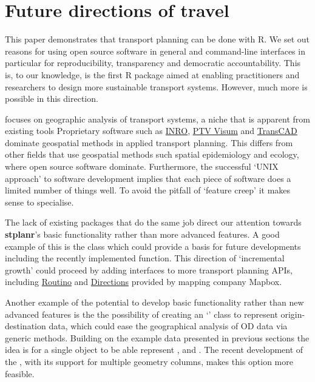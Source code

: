 \section{Future directions of travel}\label{future-directions-of-travel}

This paper demonstrates that transport planning can be done with R.
We set out reasons for using open source software in general and command-line interfaces in particular for reproducibility, transparency and democratic accountability.
This is, to our knowledge, is the first R package aimed at enabling practitioners and researchers to design more sustainable transport systems.
However, much more is possible in this direction.

 focuses on geographic analysis of transport systems, a niche that is apparent from existing tools
Proprietary software such as \href{https://www.inrosoftware.com/en/products/emme/}{INRO}, \href{http://vision-traffic.ptvgroup.com/en-us/products/ptv-visum/}{PTV Visum} and  \href{http://www.caliper.com/tcovu.htm}{TransCAD} dominate geospatial methods in applied transport planning.
This differs from other fields that use geospatial methods such spatial epidemiology and ecology, where open source software dominate.
Furthermore, the successful `UNIX approach' to software development implies that each piece of software does a limited number of things well.
To avoid the pitfall of `feature creep' it makes sense to specialise.

The lack of existing packages that do the same job direct our attention towards \textbf{stplanr}'s basic functionality rather than more advanced features.
A good example of this is the  class which could provide a basis for future developments including the recently implemented  function.
This direction of `incremental growth' could proceed by adding interfaces to more transport planning APIs, including \href{https://www.routino.org/uk/}{Routino} and \href{https://www.mapbox.com/directions/}{Directions} provided by mapping company Mapbox.

Another example of the potential to develop basic functionality rather than new advanced features is the the possibility of creating an `' class to represent origin-destination data, which could ease the geographical analysis of OD data via generic methods.
Building on the example data presented in previous sections the idea is for a single  object to be able represent ,  and .
The recent development of the , with its support for multiple geometry columns, makes this option more feasible.

